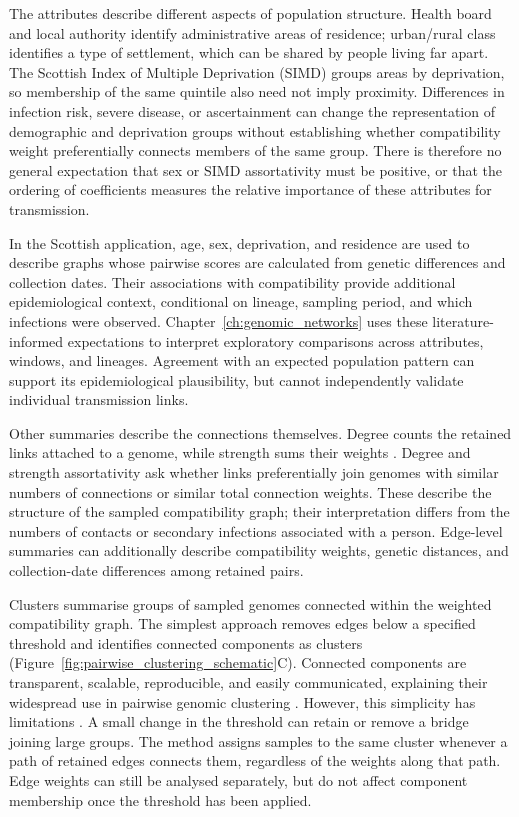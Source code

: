 The attributes describe different aspects of population structure. Health board and local authority identify administrative areas of residence; urban/rural class identifies a type of settlement, which can be shared by people living far apart. The Scottish Index of Multiple Deprivation (SIMD) groups areas by deprivation, so membership of the same quintile also need not imply proximity. Differences in infection risk, severe disease, or ascertainment can change the representation of demographic and deprivation groups without establishing whether compatibility weight preferentially connects members of the same group. There is therefore no general expectation that sex or SIMD assortativity must be positive, or that the ordering of coefficients measures the relative importance of these attributes for transmission.

In the Scottish application, age, sex, deprivation, and residence are used to describe graphs whose pairwise scores are calculated from genetic differences and collection dates. Their associations with compatibility provide additional epidemiological context, conditional on lineage, sampling period, and which infections were observed. Chapter~\ref{ch:genomic_networks} uses these literature-informed expectations to interpret exploratory comparisons across attributes, windows, and lineages. Agreement with an expected population pattern can support its epidemiological plausibility, but cannot independently validate individual transmission links.

Other summaries describe the connections themselves. Degree counts the retained links attached to a genome, while strength sums their weights \citep{Newman2003}. Degree and strength assortativity ask whether links preferentially join genomes with similar numbers of connections or similar total connection weights. These describe the structure of the sampled compatibility graph; their interpretation differs from the numbers of contacts or secondary infections associated with a person. Edge-level summaries can additionally describe compatibility weights, genetic distances, and collection-date differences among retained pairs.

Clusters summarise groups of sampled genomes connected within the weighted compatibility graph. The simplest approach removes edges below a specified threshold and identifies connected components as clusters (Figure~\ref{fig:pairwise_clustering_schematic}C). Connected components are transparent, scalable, reproducible, and easily communicated, explaining their widespread use in pairwise genomic clustering \citep{KosakovskyPond2018,Stimson2019,Sobkowiak2022,Sobkowiak2023}. However, this simplicity has limitations \citep{Liu2023,Poon2016}. A small change in the threshold can retain or remove a bridge joining large groups. The method assigns samples to the same cluster whenever a path of retained edges connects them, regardless of the weights along that path. Edge weights can still be analysed separately, but do not affect component membership once the threshold has been applied.

